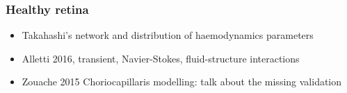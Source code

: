 \documentclass[12pt,a4paper]{article}
\begin{document}


\subsubsection{Healthy retina}
\begin{itemize}
\item Takahashi's network and distribution of haemodynamics parameters
\item Alletti 2016, transient, Navier-Stokes, fluid-structure interactions
\item Zouache 2015 Choriocapillaris modelling: talk about the missing validation
\end{itemize}
\end{document}
